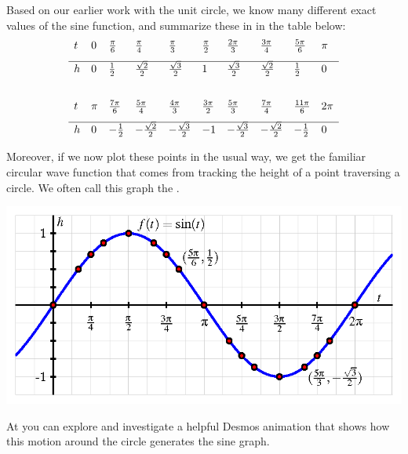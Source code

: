 \documentclass[nooutcomes]{ximera}
\begin{document}
Based on our earlier work with the unit circle, we know many different exact values of the sine function, and summarize these in in the table below:
\[
\begin{array}{llllllllll}
t&0&\frac{\pi}{6}&\frac{\pi}{4}&\frac{\pi}{3}&\frac{\pi}{2}&\frac{2\pi}{3}&\frac{3\pi}{4}&\frac{5\pi}{6}&\pi\\[8pt]
\hline \\[-3ex]
h&0&\frac{1}{2}&\frac{\sqrt{2}}{2}&\frac{\sqrt{3}}{2}&1&\frac{\sqrt{3}}{2}&\frac{\sqrt{2}}{2}&\frac{1}{2}&0\\[10pt]
&&&&&&&&&\\
t&\pi&\frac{7\pi}{6}&\frac{5\pi}{4}&\frac{4\pi}{3}&\frac{3\pi}{2}&\frac{5\pi}{3}&\frac{7\pi}{4}&\frac{11\pi}{6}&2\pi\\[8pt]
\hline\\[-3ex]
h&0&-\frac{1}{2}&-\frac{\sqrt{2}}{2}&-\frac{\sqrt{3}}{2}&-1&-\frac{\sqrt{3}}{2}&-\frac{\sqrt{2}}{2}&-\frac{1}{2}&0
\end{array}
\]

Moreover, if we now plot these points in the usual way, we get the familiar circular wave function that comes from tracking the height of a point traversing a circle.  We often call this graph the .

\begin{image}
\includegraphics{sine-definition-graph.png}
\end{image}

At  you can explore and investigate a helpful Desmos animation that shows how this motion around the circle generates the sine graph.
\end{document}
